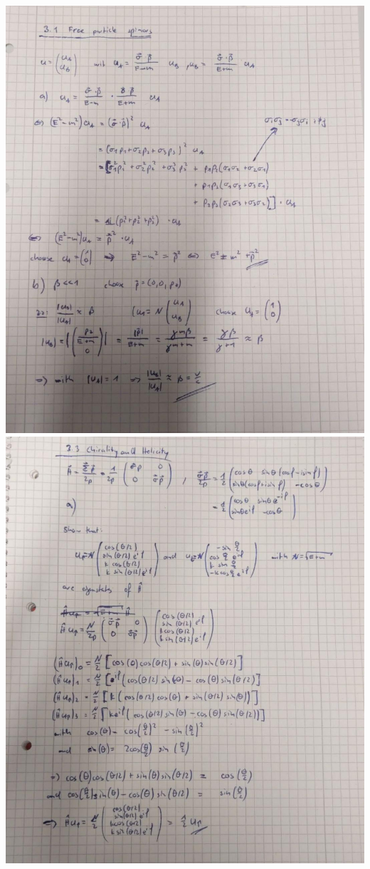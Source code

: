 \documentclass{article}
\begin{document}
    
    
    \includegraphics[width=\textwidth]{1.jpg}\\
    \includegraphics[width=\textwidth]{2.jpg}\\
\end{document}
